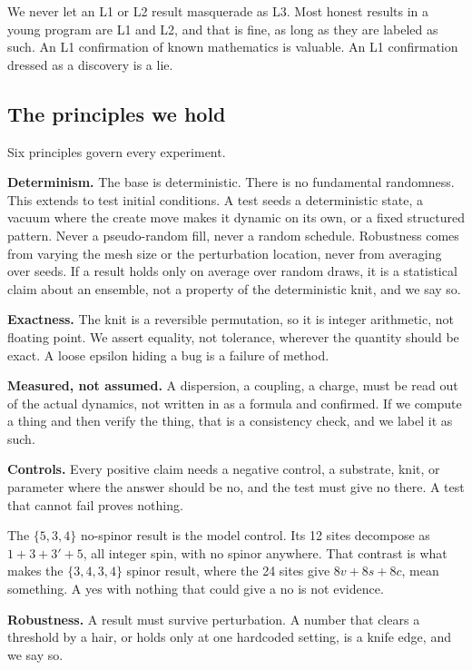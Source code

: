 We never let an L1 or L2 result masquerade as L3. Most honest results in a young program are L1 and L2, and that is fine, as long as they are labeled as such. An L1 confirmation of known mathematics is valuable. An L1 confirmation dressed as a discovery is a lie.

\subsection{The principles we hold}

Six principles govern every experiment.

\textbf{Determinism.} The base is deterministic. There is no fundamental randomness. This extends to test initial conditions. A test seeds a deterministic state, a vacuum where the create move makes it dynamic on its own, or a fixed structured pattern. Never a pseudo-random fill, never a random schedule. Robustness comes from varying the mesh size or the perturbation location, never from averaging over seeds. If a result holds only on average over random draws, it is a statistical claim about an ensemble, not a property of the deterministic knit, and we say so.

\textbf{Exactness.} The knit is a reversible permutation, so it is integer arithmetic, not floating point. We assert equality, not tolerance, wherever the quantity should be exact. A loose epsilon hiding a bug is a failure of method.

\textbf{Measured, not assumed.} A dispersion, a coupling, a charge, must be read out of the actual dynamics, not written in as a formula and confirmed. If we compute a thing and then verify the thing, that is a consistency check, and we label it as such.

\textbf{Controls.} Every positive claim needs a negative control, a substrate, knit, or parameter where the answer should be no, and the test must give no there. A test that cannot fail proves nothing.

\begin{result}
The $\{5,3,4\}$ no-spinor result is the model control. Its 12 sites decompose as $1 + 3 + 3' + 5$, all integer spin, with no spinor anywhere. That contrast is what makes the $\{3,4,3,4\}$ spinor result, where the 24 sites give $8v + 8s + 8c$, mean something. A yes with nothing that could give a no is not evidence.
\end{result}

\textbf{Robustness.} A result must survive perturbation. A number that clears a threshold by a hair, or holds only at one hardcoded setting, is a knife edge, and we say so.

